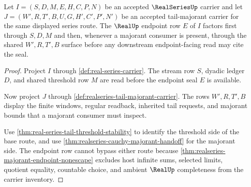 \begin{theorem}
\label{thm:realseries-endpoint-majorant-factorization}
Let $I=(S,D,M,E,H,C,P,N)$ be an accepted $\RealSeriesUp$ carrier and let $J=(W',R,T',B,U,G,H',C',P',N')$ be an accepted tail-majorant carrier for the same displayed series route. The $\RealUp$ endpoint row $E$ of $I$ factors first through $S,D,M$ and then, whenever a majorant consumer is present, through the shared $W',R,T',B$ surface before any downstream endpoint-facing read may cite the seal.
\end{theorem}
\begin{proof}
Project $I$ through \autoref{def:real-series-carrier}. The stream row $S$, dyadic ledger $D$, and shared threshold row $M$ are read before the endpoint seal $E$ is available.

Now project $J$ through \autoref{def:realseries-tail-majorant-carrier}. The rows $W',R,T',B$ display the finite windows, regular readback, inherited tail requests, and majorant bounds that a majorant consumer must inspect.

Use \autoref{thm:real-series-tail-threshold-stability} to identify the threshold side of the base route, and use \autoref{thm:realseries-cauchy-majorant-handoff} for the majorant side. The endpoint row cannot bypass either route because \autoref{thm:realseries-majorant-endpoint-nonescape} excludes host infinite sums, selected limits, quotient equality, countable choice, and ambient $\RealUp$ completeness from the carrier inventory.
\end{proof}

